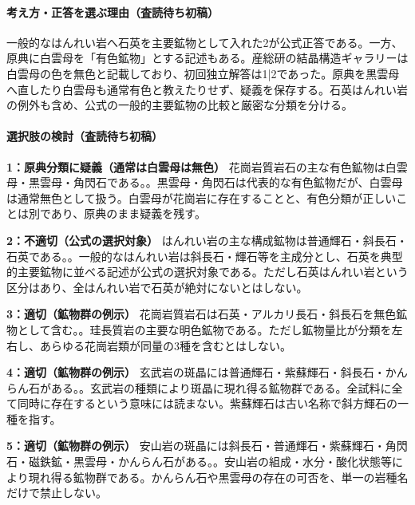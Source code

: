 \paragraph{考え方・正答を選ぶ理由（査読待ち初稿）} 一般的なはんれい岩へ石英を主要鉱物として入れた2が公式正答である。一方、原典に白雲母を「有色鉱物」とする記述もある。産総研の結晶構造ギャラリーは白雲母の色を無色と記載しており、初回独立解答は1|2であった。原典を黒雲母へ直したり白雲母も通常有色と教えたりせず、疑義を保存する。石英はんれい岩の例外も含め、公式の一般的主要鉱物の比較と厳密な分類を分ける。

\paragraph{選択肢の検討（査読待ち初稿）}\mbox{}\par

\noindent\textbf{1：原典分類に疑義（通常は白雲母は無色）} 花崗岩質岩石の主な有色鉱物は白雲母・黒雲母・角閃石である。。黒雲母・角閃石は代表的な有色鉱物だが、白雲母は通常無色として扱う。白雲母が花崗岩に存在することと、有色分類が正しいことは別であり、原典のまま疑義を残す。\par

\noindent\textbf{2：不適切（公式の選択対象）} はんれい岩の主な構成鉱物は普通輝石・斜長石・石英である。。一般的なはんれい岩は斜長石・輝石等を主成分とし、石英を典型的主要鉱物に並べる記述が公式の選択対象である。ただし石英はんれい岩という区分はあり、全はんれい岩で石英が絶対にないとはしない。\par

\noindent\textbf{3：適切（鉱物群の例示）} 花崗岩質岩石は石英・アルカリ長石・斜長石を無色鉱物として含む。。珪長質岩の主要な明色鉱物である。ただし鉱物量比が分類を左右し、あらゆる花崗岩類が同量の3種を含むとはしない。\par

\noindent\textbf{4：適切（鉱物群の例示）} 玄武岩の斑晶には普通輝石・紫蘇輝石・斜長石・かんらん石がある。。玄武岩の種類により斑晶に現れ得る鉱物群である。全試料に全て同時に存在するという意味には読まない。紫蘇輝石は古い名称で斜方輝石の一種を指す。\par

\noindent\textbf{5：適切（鉱物群の例示）} 安山岩の斑晶には斜長石・普通輝石・紫蘇輝石・角閃石・磁鉄鉱・黒雲母・かんらん石がある。。安山岩の組成・水分・酸化状態等により現れ得る鉱物群である。かんらん石や黒雲母の存在の可否を、単一の岩種名だけで禁止しない。\par


